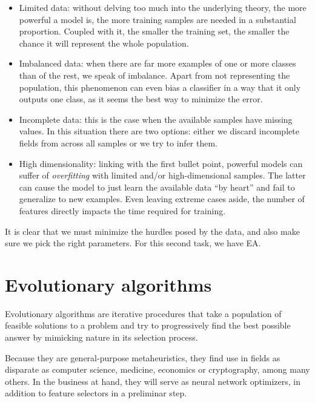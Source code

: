     \begin{itemize}

    	\item
    	Limited data: without delving too much into the underlying theory, the more powerful a model is, the more training samples are needed in a substantial proportion. Coupled with it, the smaller the training set, the smaller the chance it will represent the whole population.

    	\item
    	Imbalanced data: when there are far more examples of one or more classes than of the rest, we speak of imbalance. Apart from not representing the population, this phenomenon can even bias a classifier in a way that it only outputs one class, as it seems the best way to minimize the error.

    	\item
    	Incomplete data: this is the case when the available samples have missing values. In this situation there are two options: either we discard incomplete fields from across all samples or we try to infer them.

    	\item
    	High dimensionality: linking with the first bullet point, powerful models can suffer of \textit{overfitting} with limited and/or high-dimensional samples. The latter can cause the model to just learn the available data ``by heart'' and fail to generalize to new examples. Even leaving extreme cases aside, the number of features directly impacts the time required for training.

    \end{itemize}

    It is clear that we must minimize the hurdles posed by the data, and also make sure we pick the right parameters. For this second task, we have \acf{EA}.

\section{Evolutionary algorithms}

	Evolutionary algorithms are iterative procedures that take a population of feasible solutions to a problem and try to progressively find the best possible answer by mimicking nature in its selection process. 

	Because they are general-purpose metaheuristics, they find use in fields as disparate as computer science, medicine, economics or cryptography, among many others. In the business at hand, they will serve as neural network optimizers, in addition to feature selectors in a preliminar step.

